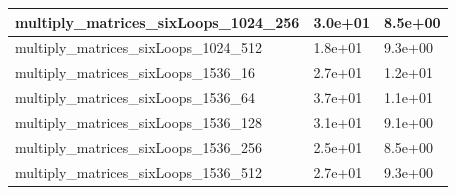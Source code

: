 \documentclass{scrartcl}
\begin{document}
\begin{table}[H]
\begin{tabular}{|l|l|l|}
multiply\_matrices\_sixLoops\_1024\_256 & 3.0e+01           & 8.5e+00            \\ \hline
multiply\_matrices\_sixLoops\_1024\_512 & 1.8e+01           & 9.3e+00            \\ \hline
multiply\_matrices\_sixLoops\_1536\_16  & 2.7e+01           & 1.2e+01            \\ \hline
multiply\_matrices\_sixLoops\_1536\_64  & 3.7e+01           & 1.1e+01            \\ \hline
multiply\_matrices\_sixLoops\_1536\_128 & 3.1e+01           & 9.1e+00            \\ \hline
multiply\_matrices\_sixLoops\_1536\_256 & 2.5e+01           & 8.5e+00            \\ \hline
multiply\_matrices\_sixLoops\_1536\_512 & 2.7e+01           & 9.3e+00            \\ \hline
\end{tabular}
\end{table}
\end{document}
